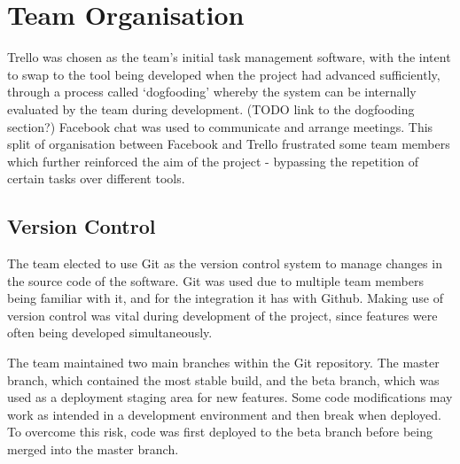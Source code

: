 \documentclass[a4paper]{l3proj}
\begin{document}




\chapter{Team Organisation}
\label{team}

Trello was chosen as the team’s initial task management software, with the intent to swap to the tool being developed when the project had advanced sufficiently, through a process called ‘dogfooding’ whereby the system can be internally evaluated by the team during development. (TODO link to the dogfooding section?)  Facebook chat was used to communicate and arrange meetings.  This split of organisation between Facebook and Trello frustrated some team members which further reinforced the aim of the project - bypassing the repetition of certain tasks over different tools. 


\section{Version Control}
\label{versionControl}

The team elected to use Git as the version control system to manage changes in the source code of the software. Git was used due to multiple team members being familiar with it, and for the integration it has with Github. Making use of version control was vital during development of the project, since features were often being developed simultaneously.

The team maintained two main branches within the Git repository. The master branch, which contained the most stable build, and the beta branch, which was used as a deployment staging area for new features. Some code modifications may work as intended in a development environment and then break when deployed. To overcome this risk, code was first deployed to the beta branch before being merged into the master branch.
\end{document}
